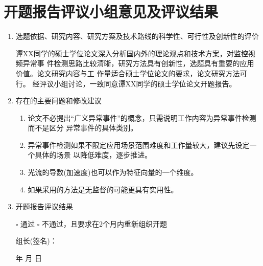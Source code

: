 

\section{开题报告评议小组意见及评议结果}
\begin{mdframed}[everyline=true]

\begin{enumerate}[label={(\arabic*)},labelsep= 3 pt]
	\item {\songti 选题依据、研究内容、研究方案及技术路线的科学性、可行性及创新性的评价}
	
	\quad\quad  谭XX同学的硕士学位论文深入分析国内外的理论观点和技术方案，对监控视频异常事 件检测思路比较清晰，研究方法具有创新性，选题具有重要的应用价值。论文研究内容与工 作量适合硕士学位论文的要求，论文研究方法可行。
	经评议小组讨论，一致同意谭XX同学的硕士学位论文开题报告。
	
	\item  {\songti 存在的主要问题和修改建议 }
	\begin{enumerate}[label={\arabic*)},labelsep=3 pt]
		\item 论文不必提出“广义异常事件”的概念，只需说明工作内容为异常事件检测而不是区分 异常事件的具体类别。
		\item 异常事件检测如果不限定应用场景范围难度和工作量较大，建议先设定一个具体的场景 以降低难度，逐步推进。
		\item 光流的导数(加速度)也可以作为特征向量的一个维度。
		\item 如果采用的方法是无监督的可能更具有实用性。
	\end{enumerate}

	\item  {\songti 开题报告评议结果}
	
    $\square$  {\songti 通过} \quad\quad \quad \quad  $\square$ {\songti 不通过，且要求在2个月内重新组织开题}
	\\[20pt]
	
	
	{  \songti
	\quad\quad\quad\quad \quad\quad\quad\quad 	\quad\quad\quad\quad \quad\quad\quad\quad 组长(签名)：
	
	\quad\quad\quad\quad \quad\quad\quad\quad 	\quad\quad\quad\quad \quad\quad\quad\quad \quad\quad\quad 年  \quad\quad 月  \quad\quad 日
	\\
    }
\end{enumerate}
\end{mdframed}
